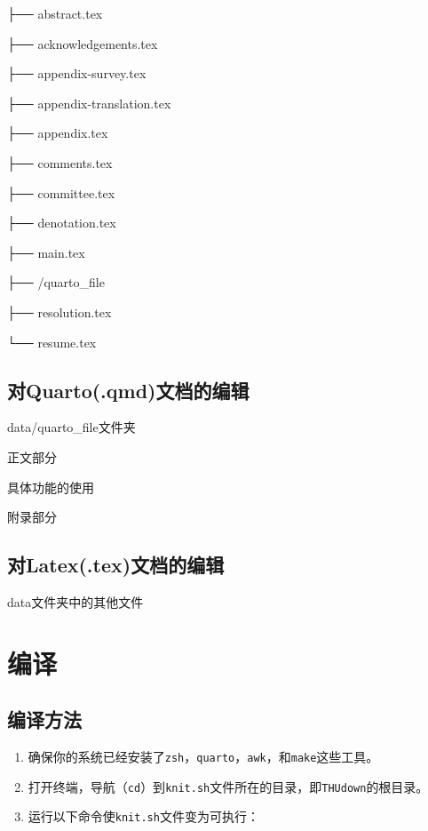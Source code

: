 ├── abstract.tex

├── acknowledgements.tex

├── appendix-survey.tex

├── appendix-translation.tex

├── appendix.tex

├── comments.tex

├── committee.tex

├── denotation.tex

├── main.tex

├── /quarto\_file

├── resolution.tex

└── resume.tex

\hypertarget{ux5bf9quarto.qmdux6587ux6863ux7684ux7f16ux8f91}{%
\subsection{对Quarto(.qmd)文档的编辑}\label{ux5bf9quarto.qmdux6587ux6863ux7684ux7f16ux8f91}}

data/quarto\_file文件夹

正文部分

具体功能的使用

附录部分

\hypertarget{ux5bf9latex.texux6587ux6863ux7684ux7f16ux8f91}{%
\subsection{对Latex(.tex)文档的编辑}\label{ux5bf9latex.texux6587ux6863ux7684ux7f16ux8f91}}

data文件夹中的其他文件

\hypertarget{ux7f16ux8bd1}{%
\section{编译}\label{ux7f16ux8bd1}}

\hypertarget{ux7f16ux8bd1ux65b9ux6cd5}{%
\subsection{编译方法}\label{ux7f16ux8bd1ux65b9ux6cd5}}

\begin{enumerate}
\def\labelenumi{\arabic{enumi}.}
\item
  确保你的系统已经安装了\texttt{zsh}，\texttt{quarto}，\texttt{awk}，和\texttt{make}这些工具。
\item
  打开终端，导航（\texttt{cd}）到\texttt{knit.sh}文件所在的目录，即\texttt{THUdown}的根目录。
\item
  运行以下命令使\texttt{knit.sh}文件变为可执行：
\end{enumerate}

